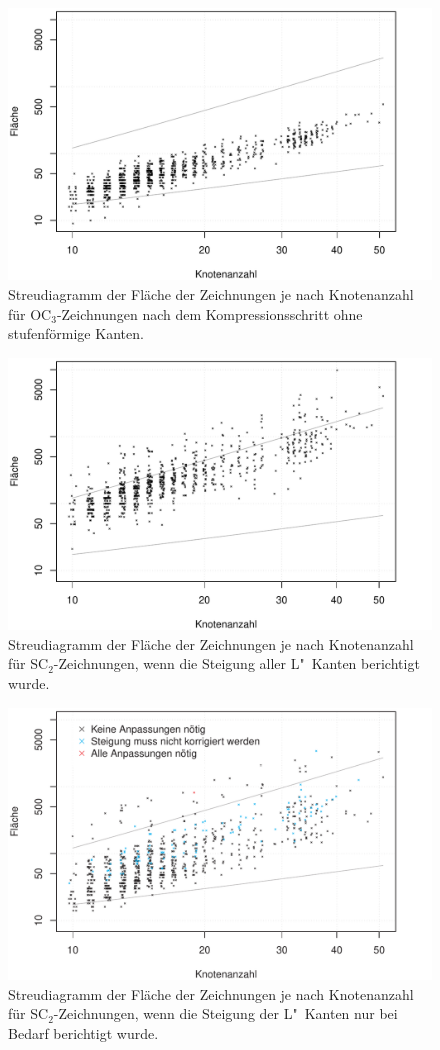 \documentclass[a4paper]{scrreprt}
\theoremstyle{definition}
\begin{document}
\begin{figure}[h]
  \centering
  \includegraphics[width=.9\textwidth]{plots/area_orthogonal_compressed}
  \caption{Streudiagramm der Fläche der Zeichnungen je nach Knotenanzahl für OC$_3$-Zeichnungen nach dem Kompressionsschritt ohne stufenförmige Kanten.}
  \label{fig:ortho-compress}
\end{figure}
\begin{figure}[h]
  \centering
  \includegraphics[width=.9\textwidth]{plots/area_smooth}
  \caption{Streudiagramm der Fläche der Zeichnungen je nach Knotenanzahl für SC$_2$-Zeichnungen, wenn die Steigung aller L"~Kanten berichtigt wurde.}
  \label{fig:smooth-noOpti}
\end{figure}
\begin{figure}[h]
  \centering
  \includegraphics[width=.9\textwidth]{plots/area_smooth_bst}
  \caption{Streudiagramm der Fläche der Zeichnungen je nach Knotenanzahl für SC$_2$-Zeichnungen, wenn die Steigung der L"~Kanten nur bei Bedarf berichtigt wurde.}
  \label{fig:smooth-opti}
\end{figure}
\end{document}
